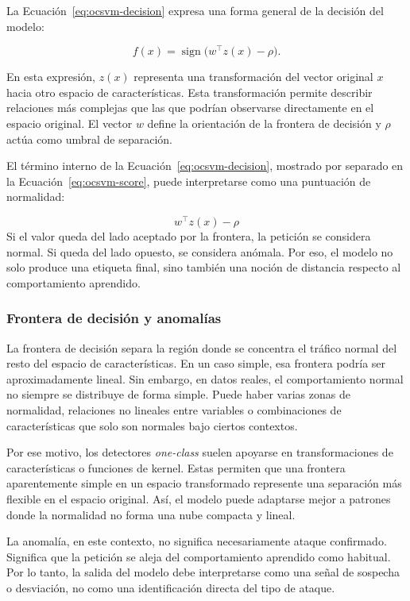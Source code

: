 \documentclass[12pt,oneside]{report}
\begin{document}
La Ecuación~\eqref{eq:ocsvm-decision} expresa una forma general de la decisión del modelo:

\begin{equation}
\label{eq:ocsvm-decision}
f(x)=\operatorname{sign}\big(w^\top z(x)-\rho\big).
\end{equation}

En esta expresión, $z(x)$ representa una transformación del vector original $x$ hacia otro espacio de características. Esta transformación permite describir relaciones más complejas que las que podrían observarse directamente en el espacio original. El vector $w$ define la orientación de la frontera de decisión y $\rho$ actúa como umbral de separación.

El término interno de la Ecuación~\eqref{eq:ocsvm-decision}, mostrado por separado en la Ecuación~\eqref{eq:ocsvm-score}, puede interpretarse como una puntuación de normalidad:

\begin{equation}
\label{eq:ocsvm-score}
w^\top z(x)-\rho
\end{equation} Si el valor queda del lado aceptado por la frontera, la petición se considera normal. Si queda del lado opuesto, se considera anómala. Por eso, el modelo no solo produce una etiqueta final, sino también una noción de distancia respecto al comportamiento aprendido.

\subsubsection{Frontera de decisión y anomalías}

La frontera de decisión separa la región donde se concentra el tráfico normal del resto del espacio de características. En un caso simple, esa frontera podría ser aproximadamente lineal. Sin embargo, en datos reales, el comportamiento normal no siempre se distribuye de forma simple. Puede haber varias zonas de normalidad, relaciones no lineales entre variables o combinaciones de características que solo son normales bajo ciertos contextos.

Por ese motivo, los detectores \textit{one-class} suelen apoyarse en transformaciones de características o funciones de kernel. Estas permiten que una frontera aparentemente simple en un espacio transformado represente una separación más flexible en el espacio original. Así, el modelo puede adaptarse mejor a patrones donde la normalidad no forma una nube compacta y lineal.

La anomalía, en este contexto, no significa necesariamente ataque confirmado. Significa que la petición se aleja del comportamiento aprendido como habitual. Por lo tanto, la salida del modelo debe interpretarse como una señal de sospecha o desviación, no como una identificación directa del tipo de ataque.
\end{document}
